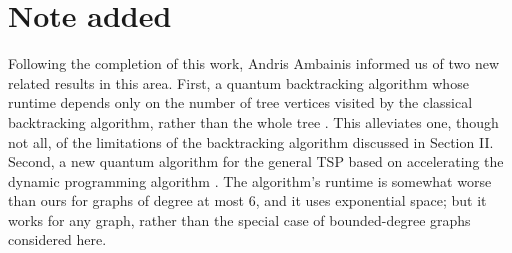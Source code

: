 \section{Note added}

Following the completion of this work, Andris Ambainis informed us of two new related results in this area. First, a quantum backtracking algorithm whose runtime depends only on the number of tree vertices visited by the classical backtracking algorithm, rather than the whole tree \cite{ambainis2016a}. This alleviates one, though not all, of the limitations of the backtracking algorithm discussed in Section II. Second, a new quantum algorithm for the general TSP based on accelerating the dynamic programming algorithm \cite{ambainis2016b}. The algorithm's runtime is somewhat worse than ours for graphs of degree at most 6, and it uses exponential space; but it works for any graph, rather than the special case of bounded-degree graphs considered here.